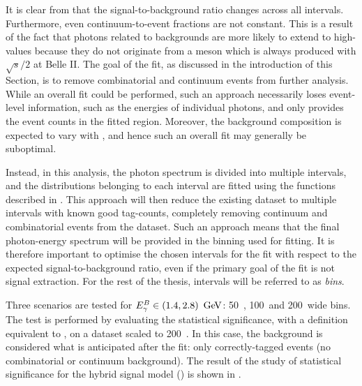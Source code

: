 It is clear from  that the signal-to-background ratio changes across all \EB intervals.
Furthermore, even continuum-to-\BB event fractions are not constant.
This is a result of the fact that photons related to \epem\ra\qqbar backgrounds are more likely to extend to high-\EB values because they do not originate from a \B meson which is always produced with $\sqrt{s}/2$ at Belle II.
The goal of the fit, as discussed in the introduction of this Section, is to remove combinatorial \BB and continuum events from further analysis.
While an overall \Mbc fit could be performed, such an approach necessarily loses event-level information, such as the energies of individual photons, and only provides the event counts in the fitted \EB region.
Moreover, the background composition is expected to vary with \EB, and hence such an overall fit may generally be suboptimal.

Instead, in this analysis, the photon spectrum is divided into multiple \EB intervals, and the \Mbc distributions belonging to each interval are fitted using the functions described in .
This approach will then reduce the existing dataset to multiple \EB intervals with known good tag-\B counts, completely removing continuum and combinatorial \BB events from the dataset.
Such an approach means that the final photon-energy spectrum will be provided in the binning used for fitting.
It is therefore important to optimise the chosen intervals for the fit with respect to the expected \BtoXsgamma signal-to-background ratio, 
even if the primary goal of the fit is not signal extraction.
For the rest of the thesis, \EB intervals will be referred to as \textit{\EB bins}.

Three scenarios are tested for ${E^B_{\gamma}}\in(1.4,2.8)~\mathrm{\,Ge\kern -0.1em V}$: 50~\mev, 100~\mev and 200~\mev wide bins.
The test is performed by evaluating the statistical significance, with a definition equivalent to , on a dataset scaled to 200~\invfb.
In this case, the background is considered what is anticipated after the \Mbc fit: only correctly-tagged \BB events (no combinatorial or continuum background).
The result of the study of statistical significance for the hybrid signal model () is shown in .

